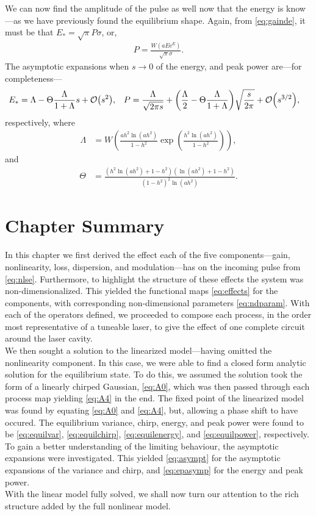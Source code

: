We can now find the amplitude of the pulse as well now that the energy is know---as we have previously found the equilibrium shape. Again, from \eqref{eq:gainde}, it must be that $E_* = \sqrt{\pi} P \sigma$, or,
\begin{align}
P = \frac{W(a E \textrm{e}^E)}{\sqrt{\pi} \sigma}.
\label{eq:equilpower}
\end{align}
The asymptotic expansions when $s \rightarrow 0$ of the energy, and peak power are---for completeness---
\begin{align}
E_* &= \Lambda - \Theta \frac{\Lambda}{1 + \Lambda} s + \bigO{s^2}, & P &= \frac{\Lambda}{\sqrt{2 \pi s}} + \left( \frac{\Lambda}{2} -  \Theta \frac{\Lambda}{1 + \Lambda} \right) \sqrt{\frac{s}{2 \pi}} +  \bigO{s^{3/2}},
\label{eq:epasymp}
\end{align}
respectively, where
\begin{align*}
\Lambda &= W\left( \frac{a h^2 \ln(a h^2)}{1 - h^2} \exp \left( \frac{h^2 \ln(a h^2)}{1 - h^2} \right) \right),
\end{align*}
and
\begin{align*}
\Theta &= \frac{\left( h^2 \ln(a h^2) + 1 - h^2 \right) \left( \ln(a h^2) + 1 - h^2 \right)}{\left( 1 - h^2 \right)^2 \ln(a h^2)}.
\end{align*}

\section{Chapter Summary}
In this chapter we first derived the effect each of the five components---gain, nonlinearity, loss, dispersion, and modulation---has on the incoming pulse from \eqref{eq:nlse}. Furthermore, to highlight the structure of these effects the system was non-dimensionalized. This yielded the functional maps \eqref{eq:effects} for the components, with corresponding non-dimensional parameters \eqref{eq:ndparam}. With each of the operators defined, we proceeded to compose each process, in the order most representative of a tuneable laser, to give the effect of one complete circuit around the laser cavity. \\

We then sought a solution to the linearized model---having omitted the nonlinearity component. In this case, we were able to find a closed form analytic solution for the equilibrium state. To do this, we assumed the solution took the form of a linearly chirped Gaussian, \eqref{eq:A0}, which was then passed through each process map yielding \eqref{eq:A4} in the end. The fixed point of the linearized model was found by equating \eqref{eq:A0} and \eqref{eq:A4}, but, allowing a phase shift to have occured. The equilibrium variance, chirp, energy, and peak power were found to be \eqref{eq:equilvar}, \eqref{eq:equilchirp}, \eqref{eq:equilenergy}, and \eqref{eq:equilpower}, respectively. To gain a better understanding of the limiting behaviour, the asymptotic expansions were investigated. This yielded \eqref{eq:asympt} for the asymptotic expansions of the variance and chirp, and \eqref{eq:epasymp} for the energy and peak power. \\

With the linear model fully solved, we shall now turn our attention to the rich structure added by the full nonlinear model. \\